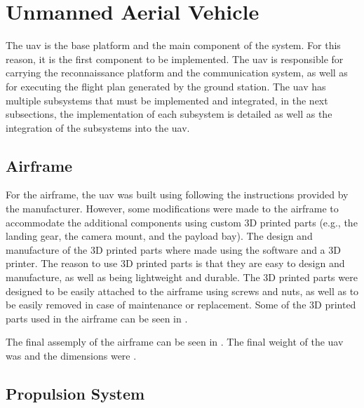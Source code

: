 \section{Unmanned Aerial Vehicle}\label{sec:implementation_uav}

The \gls{uav} is the base platform and the main component of the system. For this reason, it is the first component to be implemented. The \gls{uav} is responsible for carrying the reconnaissance platform and the communication system, as well as for executing the flight plan generated by the ground station. The \gls{uav} has multiple subsystems that must be implemented and integrated, in the next subsections, the implementation of each subsystem is detailed as well as the integration of the subsystems into the \gls{uav}.

\subsection{Airframe}\label{subsec:implementation_airframe}

For the airframe, the \gls{uav} was built using following the instructions provided by the manufacturer. However, some modifications were made to the airframe to accommodate the additional components using custom 3D printed parts (e.g., the landing gear, the camera mount, and the payload bay). The design and manufacture of the 3D printed parts where made using the  software and a  3D printer. The reason to use 3D printed parts is that they are easy to design and manufacture, as well as being lightweight and durable. The 3D printed parts were designed to be easily attached to the airframe using screws and nuts, as well as to be easily removed in case of maintenance or replacement. Some of the 3D printed parts used in the airframe can be seen in .


The final assemply of the airframe can be seen in . The final weight of the \gls{uav} was  and the dimensions were .


\subsection{Propulsion System}\label{subsec:implementation_propulsion_system}

